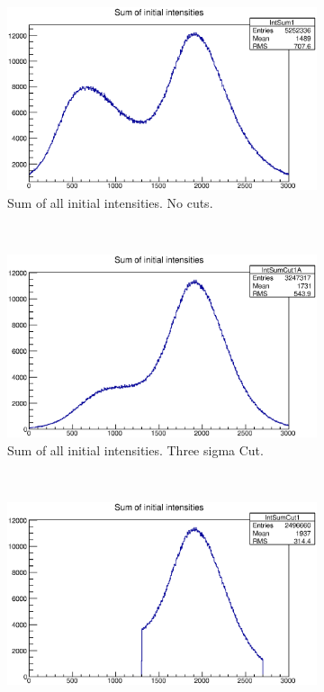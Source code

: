 \begin{figure}[h]
    \centering
    \begin{subfigure}[h]{0.3\textwidth}
        \centering
        \includegraphics[width=\textwidth, keepaspectratio = true]{nocutsIsum}
        \caption{Sum of all initial intensities. No cuts.}
        \label{fig:nocutsIsum}
    \end{subfigure}
    ~
    \begin{subfigure}[h]{0.3\textwidth}
        \centering
        \includegraphics[width=\textwidth, keepaspectratio = true]{3sigcutIsum}
        \caption{Sum of all initial intensities. Three sigma Cut.}
        \label{fig:3sigcutIsum}
    \end{subfigure}
    ~
    \begin{subfigure}[h]{0.3\textwidth}
        \centering
        \includegraphics[width=\textwidth, keepaspectratio = true]{allcutsIsum}

\end{subfigure}
\end{figure}
